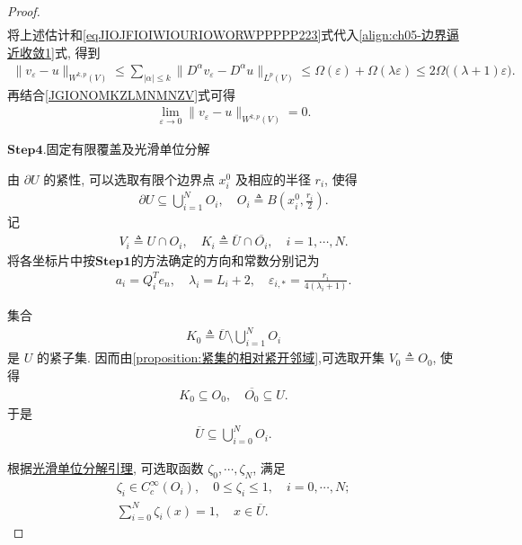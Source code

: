 \documentclass[../../main.tex]{subfiles}
\begin{document}
\begin{proof}
\begin{align*}
\end{align*}
将上述估计和\eqref{eqJIOJFIOIWIOURIOWORWPPPPP223}式代入\eqref{align:ch05-边界逼近收敛1}式, 得到
\begin{align}\label{NJHIOUSNKNZKHJFUH325}
\|v_{\varepsilon}-u\|_{W^{k,p}(V)}
\leqslant
\sum\limits_{|\alpha|\leqslant k}
\|D^{\alpha}v_{\varepsilon}-D^{\alpha}u\|_{L^{p}(V)}\leqslant
\Omega(\varepsilon)+\Omega(\lambda\varepsilon)
\leqslant
2\Omega\bigl((\lambda+1)\varepsilon\bigr).
\end{align}
再结合\eqref{JGIONOMKZLMNMNZV}式可得
\begin{align}
\lim\limits_{\varepsilon\to 0}
\|v_{\varepsilon}-u\|_{W^{k,p}(V)}=0.
\label{align:ch05-边界逼近收敛}
\end{align}

\noindent$\mathbf{Step}\bm{4}$.{\heiti 固定有限覆盖及光滑单位分解}

由 $\partial U$ 的紧性, 可以选取有限个边界点 $x_i^0$ 及相应的半径 $r_i$, 使得
\begin{align*}
\partial U\subseteq
\bigcup\limits_{i=1}^{N}O_i,\quad
O_i\triangleq B\left(x_i^0,\frac{r_i}{2}\right).
\end{align*}
记
\begin{align*}
V_i\triangleq U\cap O_i,\quad
K_i\triangleq\overline{U}\cap\overline{O_i},
\quad i=1,\cdots,N.
\end{align*}
将各坐标片中按$\mathbf{Step1}$的方法确定的方向和常数分别记为
\begin{align*}
a_i=Q_i^{T}e_n,\quad
\lambda_i=L_i+2,\quad
\varepsilon_{i,*}=\frac{r_i}{4(\lambda_i+1)}.
\end{align*}

集合
\begin{align*}
K_0
\triangleq
\overline{U}\setminus\bigcup\limits_{i=1}^{N}O_i
\end{align*}
是 $U$ 的紧子集. 因而由\cref{proposition:紧集的相对紧开邻域},可选取开集 $V_0\triangleq O_0$, 使得
\begin{align*}
K_0\subseteq O_0,\quad
\overline{O_0}\subseteq U.
\end{align*}
于是
\begin{align*}
\overline{U}\subseteq
\bigcup\limits_{i=0}^{N}O_i.
\end{align*}

根据\hyperref[lemma:ch05-光滑单位分解-p7R3]{光滑单位分解引理}, 可选取函数
$\zeta_0,\cdots,\zeta_N$, 满足
\begin{gather*}
\zeta_i\in C_c^{\infty}(O_i),\quad
0\leqslant\zeta_i\leqslant1,\quad
i=0,\cdots,N;\\
\sum\limits_{i=0}^{N}\zeta_i(x)=1,\quad x\in \overline{U}.
\end{gather*}


\end{proof}
\end{document}
